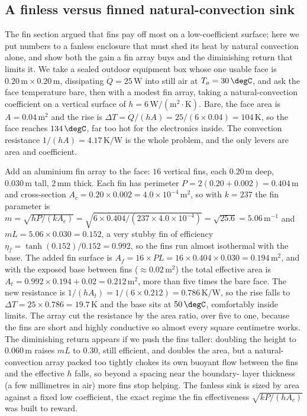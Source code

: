 \subsection{A finless versus finned natural-convection sink}

The fin section argued that fins pay off most on a low-coefficient surface;
here we put numbers to a fanless enclosure that must shed its heat by
natural convection alone, and show both the gain a fin array buys and the
diminishing return that limits it. We take a sealed outdoor equipment box
whose one usable face is $0.20\,\text{m}\times0.20\,\text{m}$, dissipating
$\dot{Q} = 25\,\text{W}$ into still air at $T_a = 30\,\degC$, and ask the
face temperature bare, then with a modest fin array, taking a
natural-convection coefficient on a vertical surface of $h = 6\,\text{W}/
(\text{m}^2\cdot\si{\kelvin})$. Bare, the face area is $A = 0.04\,\text{m}^2$
and the rise is $\Delta T = \dot{Q}/(hA) = 25/(6\times0.04) = 104\,\si{
\kelvin}$, so the face reaches $134\,\degC$, far too hot for the
electronics inside. The convection resistance $1/(hA) = 4.17\,\si{\kelvin}/
\text{W}$ is the whole problem, and the only levers are area and
coefficient.

Add an aluminium fin array to the face: $16$ vertical fins, each $0.20\,
\text{m}$ deep, $0.030\,\text{m}$ tall, $2\,\si{\milli\meter}$ thick. Each
fin has perimeter $P = 2(0.20 + 0.002) = 0.404\,\text{m}$ and cross-section
$A_c = 0.20\times0.002 = 4.0\times10^{-4}\,\text{m}^2$, so with $k = 237$
the fin parameter is $m = \sqrt{hP/(kA_c)} = \sqrt{6\times0.404/(237\times
4.0\times10^{-4})} = \sqrt{25.6} = 5.06\,\text{m}^{-1}$ and $mL = 5.06\times
0.030 = 0.152$, a very stubby fin of efficiency $\eta_f = \tanh(0.152)/
0.152 = 0.992$, so the fins run almost isothermal with the base. The added
fin surface is $A_f = 16\times P L = 16\times0.404\times0.030 = 0.194\,
\text{m}^2$, and with the exposed base between fins ($\approx 0.02\,\text{m}
^2$) the total effective area is $A_t = 0.992\times0.194 + 0.02 = 0.212\,
\text{m}^2$, more than five times the bare face. The new resistance is
$1/(hA_t) = 1/(6\times0.212) = 0.786\,\si{\kelvin}/\text{W}$, so the rise
falls to $\Delta T = 25\times0.786 = 19.7\,\si{\kelvin}$ and the base sits
at $50\,\degC$, comfortably inside limits. The array cut the resistance by
the area ratio, over five to one, because the fins are short and highly
conductive so almost every square centimetre works. The diminishing return
appears if we push the fins taller: doubling the height to $0.060\,\text{m}$
raises $mL$ to $0.30$, still efficient, and doubles the area, but a natural-
convection array packed too tightly chokes its own buoyant flow between the
fins and the effective $h$ falls, so beyond a spacing near the boundary-
layer thickness (a few millimetres in air) more fins stop helping. The
fanless sink is sized by area against a fixed low coefficient, the exact
regime the fin effectiveness $\sqrt{kP/(hA_c)}$ was built to reward.

